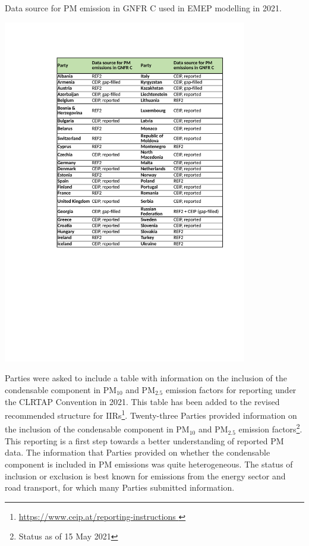 \begin{table}
  \caption{Data source for PM emission in GNFR C used in EMEP modelling in 2021.}
\centering
{\includegraphics*[viewport=120 275 550 760,clip,width=0.8\textwidth]{FIGS_CEIP/Table1.pdf}}
\label{tab:CEIP1}  
\end{table}

Parties were asked to include a table with information on the inclusion of the condensable component in PM$_{10}$ and PM$_{2.5}$ emission factors for reporting under the CLRTAP Convention in 2021. This table has been added to the revised
recommended structure for IIRs\footnote{\url{https://www.ceip.at/reporting-instructions } }. Twenty-three Parties provided information on the inclusion of the condensable component in PM$_{10}$ and PM$_{2.5}$ emission factors\footnote{Status as of 15 May 2021}. This reporting is a first step towards a better understanding of reported PM data. The information that Parties provided on whether the condensable component is included in PM emissions was quite heterogeneous. The status of inclusion or exclusion is best known for emissions from the energy sector and road transport, for which many Parties submitted information. 

